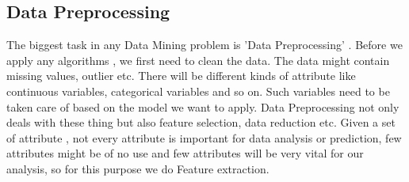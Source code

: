 \documentclass[fleqn,10pt]{SelfArx} %
\begin{document}
\subsection{Data Preprocessing}
The biggest task in any Data Mining problem is 'Data Preprocessing' . Before we apply any algorithms , we first need to clean the data. The data might contain missing values, outlier etc. There will be different kinds of attribute like continuous variables, categorical variables and so on. Such variables need to be taken care of based on the model we want to apply.  Data Preprocessing not only deals with these thing but also feature selection, data reduction etc. Given a set of attribute , not every attribute is important for data analysis or prediction, few attributes might be of no use and few attributes will be very vital for our analysis, so for this purpose we do Feature extraction. 
\end{document}
